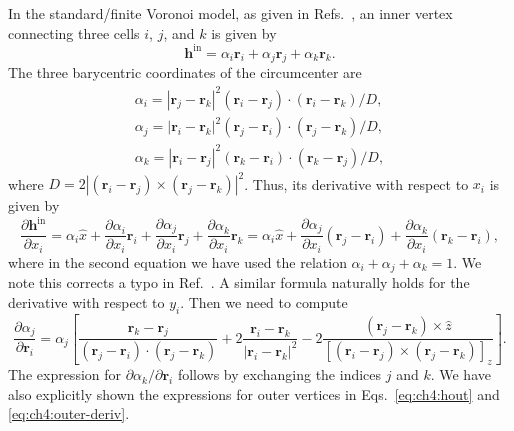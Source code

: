 In the standard/finite Voronoi model, as given in Refs.~\cite{bi2016motility, teomy2018confluent}, an inner vertex connecting three cells $i$, $j$, and $k$ is given by
\begin{equation}
    \mathbf{h}^\textrm{in}=\alpha_i\mathbf{r}_i + \alpha_j\mathbf{r}_j + \alpha_k\mathbf{r}_k.
\end{equation}
The three barycentric coordinates of the circumcenter are
\begin{subequations}
\begin{eqnarray}
    \alpha_i=|\mathbf{r}_j-\mathbf{r}_k|^2(\mathbf{r}_i-\mathbf{r}_j)\cdot(\mathbf{r}_i-\mathbf{r}_k)/D,\\
    \alpha_j=|\mathbf{r}_i-\mathbf{r}_k|^2(\mathbf{r}_j-\mathbf{r}_i)\cdot(\mathbf{r}_j-\mathbf{r}_k)/D,\\
    \alpha_k=|\mathbf{r}_i-\mathbf{r}_j|^2(\mathbf{r}_k-\mathbf{r}_i)\cdot(\mathbf{r}_k-\mathbf{r}_j)/D,
\end{eqnarray}
\end{subequations}
where $D=2|(\mathbf{r}_i-\mathbf{r}_j)\times(\mathbf{r}_j-\mathbf{r}_k)|^2$. Thus, its derivative with respect to $x_i$ is given by
\begin{equation}
    \frac{\partial\mathbf{h}^\textrm{in}}{\partial x_i}=\alpha_i\hat{x}+\frac{\partial\alpha_i} {\partial x_i}\mathbf{r}_i+\frac{\partial\alpha_j}{\partial x_i}\mathbf{r}_j+\frac{\partial\alpha_k}{\partial x_i}\mathbf{r}_k =\alpha_i\hat{x}+\frac{\partial\alpha_j}{\partial x_i}(\mathbf{r}_j-\mathbf{r}_i)+\frac{\partial\alpha_k}{\partial x_i}(\mathbf{r}_k-\mathbf{r}_i),
\end{equation}
where in the second equation we have used the relation $\alpha_i + \alpha_j+ \alpha_k=1$.
We note this corrects a typo in Ref.~\cite{teomy2018confluent}.
A similar formula naturally holds for the derivative with respect to $y_i$.
Then we need to compute
\begin{equation}
    \frac{\partial \alpha_j}{\partial \mathbf{r}_i} = \alpha_j\left[\frac{\mathbf{r}_k-\mathbf{r}_j}{(\mathbf{r}_j-\mathbf{r}_i)\cdot(\mathbf{r}_j-\mathbf{r}_k)} + 2\frac{\mathbf{r}_i-\mathbf{r}_k}{|\mathbf{r}_i-\mathbf{r}_k|^2}-2\frac{(\mathbf{r}_j-\mathbf{r}_k)\times\hat{z}}{[(\mathbf{r}_i-\mathbf{r}_j)\times(\mathbf{r}_j-\mathbf{r}_k)]_z}\right].
\end{equation}
The expression for $\partial \alpha_k/\partial \mathbf{r}_i$ follows by exchanging the indices $j$ and $k$.
We have also explicitly shown the expressions for outer vertices in Eqs.~\eqref{eq:ch4:hout} and \eqref{eq:ch4:outer-deriv}.

